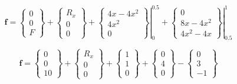         \begin{equation*}
            \mathbf{f} = 
            \begin{Bmatrix}
                0 \\
                0 \\
                F
            \end{Bmatrix}
            + \begin{Bmatrix}
                R_x \\
                0 \\
                0
            \end{Bmatrix}
            + \left.
            \begin{Bmatrix}
                4x-4x^2\\
                4x^2 \\
                0
            \end{Bmatrix}\right|_{0}^{0.5}
            + \left.
            \begin{Bmatrix}
                0\\
                8x-4x^2 \\
                4x^2-4x
            \end{Bmatrix} \right|_{0.5}^{1}
        \end{equation*}

        \begin{equation*}
            \mathbf{f} = 
            \begin{Bmatrix}
                0 \\
                0 \\
                10
            \end{Bmatrix}
            + \begin{Bmatrix}
                R_x \\
                0 \\
                0
            \end{Bmatrix}
            +
            \begin{Bmatrix}
                1\\
                1\\
                0
            \end{Bmatrix}
            +
            \begin{Bmatrix}
                0\\
                4 \\
                0
            \end{Bmatrix}
            -
            \begin{Bmatrix}
                0\\
                3 \\
                -1
            \end{Bmatrix}
        \end{equation*}

